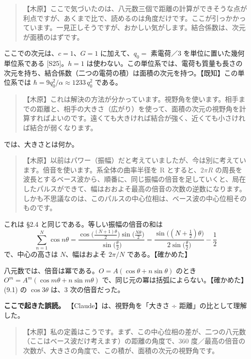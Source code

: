 \documentclass[
  a4paper,
]{ltjsarticle}
\begin{document}
\begin{quote}
【木原】ここで気づいたのは、八元数三個で距離の計算ができそうな点が利点ですが、あくまで比で、読めるのは角度だけです。ここが引っかかっています。一見正しそうですが、おかしい気がします。結合係数は、次元が面積のはずです。
\end{quote}

ここでの次元は、\(c = 1\)、\(G = 1\) に加えて、\(q_0 =\) 素電荷／3
を単位に置いた幾何単位系である {[}S25{]}。\(h = 1\)
は使わない。この単位系では、電荷も質量も長さの次元を持ち、結合係数（二つの電荷の積）は面積の次元を持つ。【既知】この単位系では
\(\hbar = 9q_0^2/\alpha \approx 1233\,q_0^2\) である。

\begin{quote}
【木原】これは解決の方法が分かっています。視野角を使います。相手までの距離と、相手の大きさ（広がり）を使って、面積の次元の視野角を計算すればよいのです。遠くても大きければ結合が強く、近くても小さければ結合が弱くなります。
\end{quote}

では、大きさとは何か。

\begin{quote}
【木原】以前はパワー（振幅）だと考えていましたが、今は別に考えています。倍音を使います。系全体の曲率半径を
R とすると、\(2\pi R\)
の周長を波長とするベース波から、順番に、同じ振幅の倍音を足していくと、局在したパルスができて、幅はおおよそ最高の倍音の次数の逆数になります。しかも不思議なのは、このパルスの中心位相は、ベース波の中心位相そのものです。
\end{quote}

これは §2.4 と同じである。等しい振幅の倍音の和は \[
\sum_{n=1}^{N}\cos n\theta = \frac{\cos\!\big(\tfrac{(N+1)\theta}{2}\big)\sin\!\big(\tfrac{N\theta}{2}\big)}{\sin\!\big(\tfrac{\theta}{2}\big)} = \frac{\sin\!\big((N+\tfrac12)\theta\big)}{2\sin\!\big(\tfrac{\theta}{2}\big)} - \frac12 \tag{12.1}
\] で、中心の高さは \(N\)、幅はおよそ \(2\pi/N\) である。【確かめた】

八元数では、倍音は冪である。\(O = A(\cos\theta + n\sin\theta)\) のとき
\(O^m = A^m(\cos m\theta + n\sin m\theta)\)
で、同じ元の冪は括弧によらない。【確かめた】(9.1) の \(\cos3\theta\)
は、3 次の倍音だった。

\textbf{ここで起きた誤読。} 【Claude】は、視野角を「大きさ ÷
距離」の比として理解した。

\begin{quote}
【木原】私の定義はこうです。まず、この中心位相の差が、二つの八元数（ここはベース波だけ考えます）の距離の角度で、360
度／最高の倍音の次数が、大きさの角度で、この積が、面積の次元の視野角です。
\end{quote}
\end{document}
